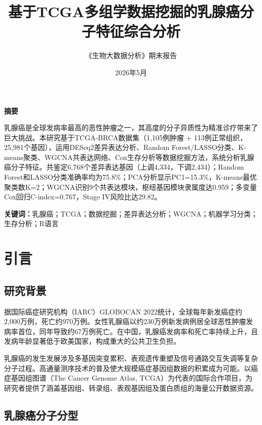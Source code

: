 \documentclass[12pt,a4paper]{article}
\title{\LARGE\textbf{基于TCGA多组学数据挖掘的乳腺癌分子特征综合分析}}
\author{\Large 《生物大数据分析》期末报告}
\date{2026年5月}
\begin{document}
\maketitle
\thispagestyle{empty}

\begin{center}
\textbf{摘\quad 要}
\end{center}

乳腺癌是全球发病率最高的恶性肿瘤之一，其高度的分子异质性为精准诊疗带来了巨大挑战。本研究基于TCGA-BRCA数据集（1,105例肿瘤 + 113例正常组织，25,981个基因），运用DESeq2差异表达分析、Random Forest/LASSO分类、K-means聚类、WGCNA共表达网络、Cox生存分析等数据挖掘方法，系统分析乳腺癌分子特征。共鉴定6,768个差异表达基因（上调4,334，下调2,434）；Random Forest和LASSO分类准确率均为75.8\%；PCA分析显示PC1=15.3\%，K-means最优聚类数K=2；WGCNA识别9个共表达模块，枢纽基因模块隶属度达0.959；多变量Cox回归C-index=0.767，Stage IV风险比达29.82。

\vspace{0.5em}
\noindent\textbf{关键词：}乳腺癌；TCGA；数据挖掘；差异表达分析；WGCNA；机器学习分类；生存分析；R语言

\newpage
\tableofcontents
\newpage

\section{引言}

\subsection{研究背景}

据国际癌症研究机构（IARC）GLOBOCAN 2022统计，全球每年新发癌症约2,000万例，死亡约970万例\cite{sung2024}。女性乳腺癌以约230万例新发病例居全球恶性肿瘤发病率首位，同年导致约67万例死亡。在中国，乳腺癌发病率和死亡率持续上升，且发病年龄显著低于欧美国家，构成重大的公共卫生负担。

乳腺癌的发生发展涉及多基因突变累积、表观遗传重塑及信号通路交互失调等复杂分子过程\cite{hanahan2011}。高通量测序技术的普及使大规模癌症基因组数据的积累成为可能。以癌症基因组图谱（The Cancer Genome Atlas, TCGA）为代表的国际合作项目，为研究者提供了涵盖基因组、转录组、表观基因组及蛋白质组的海量公开数据资源\cite{tcga2012}。

\subsection{乳腺癌分子分型}
\end{document}
